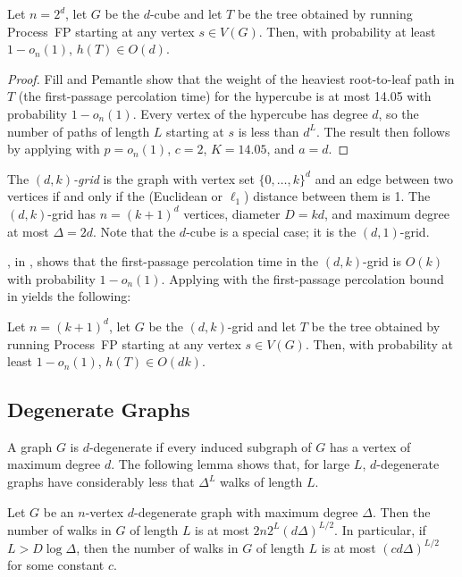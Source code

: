 \documentclass[lotsofwhite]{patmorin}
\begin{document}
\begin{thm}
  Let $n=2^d$, let $G$ be the $d$-cube and let $T$ be the tree obtained
  by running Process~FP starting at any vertex $s\in V(G)$.  Then,
  with probability at least $1-o_n(1)$, $h(T)\in O(d)$.
\end{thm}

\begin{proof}
  Fill and Pemantle \cite{fill.pemantle:percolation} show that the weight of
  the heaviest root-to-leaf path in $T$ (the first-passage percolation
  time) for the hypercube is at most 14.05 with probability $1-o_n(1)$.
  Every vertex of the hypercube has degree $d$, so the number of paths
  of length $L$ starting at $s$ is less than $d^L$.  The result then follows
  by applying  with $p=o_n(1)$, $c=2$, $K=14.05$,
  and $a=d$.
\end{proof}

The \emph{$(d,k)$-grid} is the graph with vertex set $\{0,\ldots,k\}^d$
and an edge between two vertices if and only if the (Euclidean or
$\ell_1$) distance between them is 1.  The $(d,k)$-grid has $n=(k+1)^d$
vertices, diameter $D=kd$, and maximum degree at most $\Delta=2d$. Note
that the $d$-cube is a special case; it is the $(d,1)$-grid.

, in , shows that
the first-passage percolation time in the $(d,k)$-grid is $O(k)$ with
probability $1-o_n(1)$.  Applying  with 
the first-passage percolation bound in  yields
the following:

\begin{cor}
  Let $n=(k+1)^d$, let $G$ be the $(d,k)$-grid and let $T$ be the tree obtained
  by running Process~FP starting at any vertex $s\in V(G)$.  Then,
  with probability at least $1-o_n(1)$, $h(T)\in O(dk)$.
\end{cor}

\subsection{Degenerate Graphs}

A graph $G$ is $d$-degenerate if every induced subgraph of $G$ has
a vertex of maximum degree $d$.  The following lemma shows that, for
large $L$, $d$-degenerate graphs have considerably less that $\Delta^L$
walks of length $L$.

\begin{lem}
   Let $G$ be an $n$-vertex $d$-degenerate graph with maximum degree
   $\Delta$.  Then the number of walks in $G$ of length $L$ is at most
   $2n2^{L}(d\Delta)^{L/2}$.  In particular, if $L > D\log\Delta$, then
   the number of walks in $G$ of length $L$ is at most $(cd\Delta)^{L/2}$
   for some constant $c$.
\end{lem}
\end{document}
